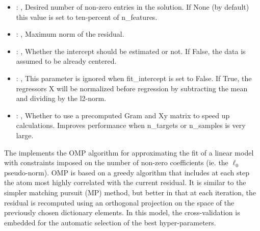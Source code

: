 \begin{itemize}
    \item {}: , 
      Desired number of non-zero entries in the solution. If None (by default)
      this value is set to ten-percent of n\_features.

    \item {}: , 
      Maximum norm of the residual.

    \item {}: , 
      Whether the intercept should be estimated or not. If False,
      the data is assumed to be already centered.

    \item {}: , 
      This parameter is ignored when fit\_intercept is set to False. If True,
      the regressors X will be normalized before regression by subtracting the mean and
      dividing by the l2-norm.

    \item {}: , 
      Whether to use a precomputed Gram and Xy matrix to speed up calculations.
      Improves performance when n\_targets or n\_samples is very large.
  \end{itemize}
 The                          implements the OMP algorithm for
 approximating the fit of a                         linear model with constraints imposed on the
 number of non-zero                         coefficients (ie. the $\ell_0$ pseudo-norm). OMP is
 based on a greedy                         algorithm that includes at each step the atom most highly
 correlated                         with the current residual. It is similar to the simpler matching
 pursuit (MP) method, but better in that at each iteration, the residual                         is
 recomputed using an orthogonal projection on the space of the                         previously
 chosen dictionary elements.                         In this model, the cross-validation is embedded
 for the automatic selection                         of the best hyper-parameters.

